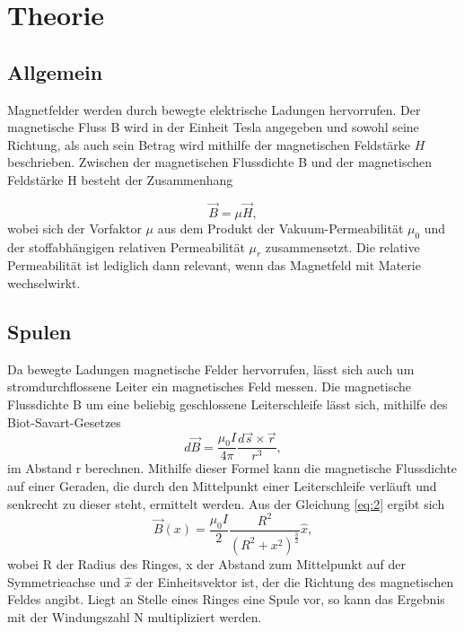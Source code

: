 \section{Theorie}
\label{sec:Theorie}


\subsection{Allgemein}
Magnetfelder werden durch bewegte elektrische Ladungen hervorrufen. Der magnetische Fluss B wird in der Einheit Tesla 
angegeben und sowohl seine Richtung, als auch sein Betrag wird mithilfe der magnetischen Feldstärke $H$ beschrieben.
Zwischen der magnetischen Flussdichte B und der magnetischen Feldstärke H besteht der Zusammenhang

\begin{equation}
    \vec B = \mu \vec H,
    \label{eq:1}
\end{equation}
\noindent
wobei sich der Vorfaktor $\mu$ aus dem Produkt der Vakuum-Permeabilität $\mu_0$ und der stoffabhängigen relativen
Permeabilität $\mu_r$ zusammensetzt. Die relative Permeabilität ist lediglich dann relevant, wenn das Magnetfeld mit Materie 
wechselwirkt.


\subsection{Spulen}

Da bewegte Ladungen magnetische Felder hervorrufen, lässt sich auch um stromdurchflossene Leiter ein 
magnetisches Feld messen. Die magnetische Flussdichte B um eine beliebig geschlossene 
Leiterschleife lässt sich, mithilfe des Biot-Savart-Gesetzes
\begin{equation}
    d\vec B = \frac{\mu_0 I}{4 \pi} \frac{d\vec s \times \vec r}{r^3},
    \label{eq:2} 
\end{equation}
\noindent
im Abstand r berechnen. Mithilfe dieser Formel kann die magnetische Flussdichte auf einer Geraden, die durch den 
Mittelpunkt einer Leiterschleife verläuft und senkrecht zu dieser steht, ermittelt werden. Aus der Gleichung \ref{eq:2} ergibt sich 
\begin{equation}
    \vec B (x) = \frac{\mu_0 I}{2} \frac{R^2}{(R^2+x^2)^\frac{3}{2}} \hat{x},
\end{equation}
\noindent
wobei R der Radius des Ringes, x der Abstand zum Mittelpunkt auf der Symmetrieachse und $\hat{x}$ der Einheitsvektor ist,
der die Richtung des magnetischen Feldes angibt.
Liegt an Stelle eines Ringes eine Spule vor, so kann das Ergebnis mit der Windungszahl N multipliziert werden.

